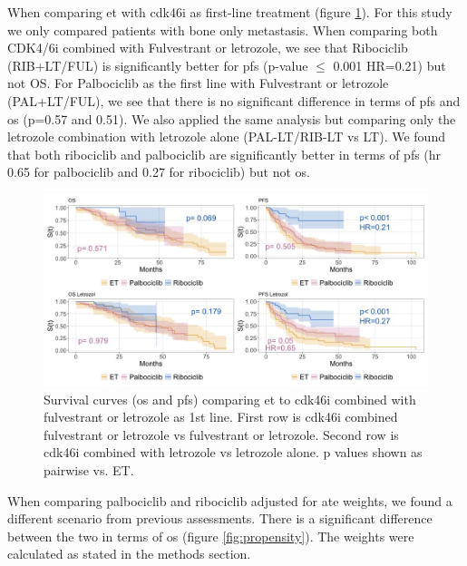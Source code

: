 When comparing \ac{et} with \ac{cdk46i} as first-line treatment (figure \ref{fig:grouped}). For this study we only compared patients with bone only metastasis. When comparing both CDK4/6i combined with Fulvestrant or letrozole, we see that  Ribociclib (RIB+LT/FUL) is significantly better for \ac{pfs} (p-value $\le$ 0.001 HR=0.21) but not OS. For Palbociclib as the first line with Fulvestrant or letrozole (PAL+LT/FUL), we see that there is no significant difference in terms of \ac{pfs} and \ac{os} (p=0.57 and 0.51). We also applied the same analysis but comparing only the letrozole combination with letrozole alone (PAL-LT/RIB-LT vs LT). We found that both ribociclib and palbociclib are significantly better in terms of \ac{pfs} (\ac{hr} 0.65 for palbociclib and 0.27 for ribociclib) but not \ac{os}.
\begin{figure}[ht]
  \centering

  \caption{Survival curves (\ac{os} and \ac{pfs}) comparing \ac{et} to \ac{cdk46i} combined with fulvestrant or letrozole as 1st line. First row is \ac{cdk46i} combined fulvestrant or letrozole vs fulvestrant or letrozole. Second row is \ac{cdk46i} combined with letrozole vs letrozole alone. p values shown as pairwise vs. ET. }\label{fig:grouped} 
  \includegraphics[scale=0.42]{figures/grouped_curve_both.jpeg}%

\end{figure}

When comparing palbociclib and ribociclib adjusted for \ac{ate} weights, we found a different scenario from previous assessments. There is a significant difference between the two in terms of \ac{os} (figure \ref*{fig:propensity}). The weights were calculated as stated in the methods section.


